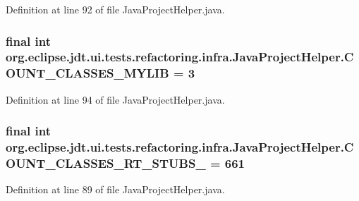 Definition at line 92 of file JavaProjectHelper.java.

\hypertarget{classorg_1_1eclipse_1_1jdt_1_1ui_1_1tests_1_1refactoring_1_1infra_1_1JavaProjectHelper_a0f75bcd17ac6c7fa55810a720858020a}{
\subsubsection[{COUNT\_\-CLASSES\_\-MYLIB}]{\setlength{\rightskip}{0pt plus 5cm}final int {\bf org.eclipse.jdt.ui.tests.refactoring.infra.JavaProjectHelper.COUNT\_\-CLASSES\_\-MYLIB} = 3}}
\label{classorg_1_1eclipse_1_1jdt_1_1ui_1_1tests_1_1refactoring_1_1infra_1_1JavaProjectHelper_a0f75bcd17ac6c7fa55810a720858020a}


Definition at line 94 of file JavaProjectHelper.java.

\hypertarget{classorg_1_1eclipse_1_1jdt_1_1ui_1_1tests_1_1refactoring_1_1infra_1_1JavaProjectHelper_aabe3ec975531ede97506dc8840f50c1e}{
\subsubsection[{COUNT\_\-CLASSES\_\-RT\_\-STUBS\_\-15}]{\setlength{\rightskip}{0pt plus 5cm}final int {\bf org.eclipse.jdt.ui.tests.refactoring.infra.JavaProjectHelper.COUNT\_\-CLASSES\_\-RT\_\-STUBS\_} = 661}}
\label{classorg_1_1eclipse_1_1jdt_1_1ui_1_1tests_1_1refactoring_1_1infra_1_1JavaProjectHelper_aabe3ec975531ede97506dc8840f50c1e}


Definition at line 89 of file JavaProjectHelper.java.

